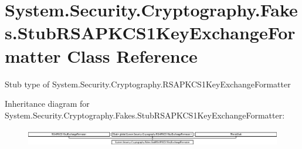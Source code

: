 \hypertarget{class_system_1_1_security_1_1_cryptography_1_1_fakes_1_1_stub_r_s_a_p_k_c_s1_key_exchange_formatter}{\section{System.\-Security.\-Cryptography.\-Fakes.\-Stub\-R\-S\-A\-P\-K\-C\-S1\-Key\-Exchange\-Formatter Class Reference}
\label{class_system_1_1_security_1_1_cryptography_1_1_fakes_1_1_stub_r_s_a_p_k_c_s1_key_exchange_formatter}
}


Stub type of System.\-Security.\-Cryptography.\-R\-S\-A\-P\-K\-C\-S1\-Key\-Exchange\-Formatter 


Inheritance diagram for System.\-Security.\-Cryptography.\-Fakes.\-Stub\-R\-S\-A\-P\-K\-C\-S1\-Key\-Exchange\-Formatter\-:\begin{figure}[H]
\begin{center}
\leavevmode
\includegraphics[height=0.771350cm]{class_system_1_1_security_1_1_cryptography_1_1_fakes_1_1_stub_r_s_a_p_k_c_s1_key_exchange_formatter}
\end{center}
\end{figure}
